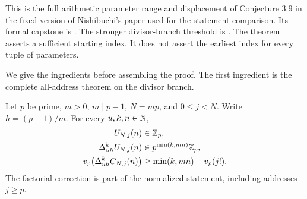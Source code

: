 This is the full arithmetic parameter range and displacement of Conjecture
3.9 in the fixed version of Nishibuchi's paper used for the statement
comparison.  Its formal capstone is
.
The stronger divisor-branch threshold is
.
The theorem asserts a sufficient starting index.  It does not assert the
earliest index for every tuple of parameters.

We give the ingredients before assembling the proof.  The first ingredient
is the complete all-address theorem on the divisor branch.

\begin{theorem}
\label{thm:arith-divisor-base}
Let $p$ be prime, $m>0$, $m\mid p-1$, $N=mp$, and $0\le j<N$.
Write $h=(p-1)/m$.  For every $u,k,n\in\mathbb N$,
\begin{align}
 U_{N,j}(n)&\in\mathbb Z_p,\label{eq:arith-divisor-integral}\\
 \Delta_{uh}^{k}U_{N,j}(n)&\in p^{\min(k,mn)}\mathbb Z_p,\label{eq:arith-divisor-bound}\\
 v_p\bigl(\Delta_{uh}^{k}C_{N,j}(n)\bigr)
   &\ge\min(k,mn)-v_p(j!).\label{eq:arith-divisor-normalized}
\end{align}
The factorial correction is part of the normalized statement, including
addresses $j\ge p$.
\end{theorem}

